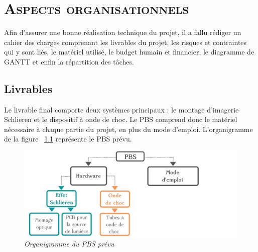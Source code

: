 \renewcommand{\chaptername}{\scshape Partie}
\chapter{\normalfont \scshape Aspects organisationnels}
Afin d'assurer une bonne réalisation technique du projet, il a fallu rédiger un cahier des charges comprenant les livrables du projet, les risques et contraintes qui y sont liés, le matériel utilisé, le budget humain et financier, le diagramme de GANTT et enfin la répartition des tâches.
\section{Livrables }
Le livrable final comporte deux systèmes principaux : le montage d'imagerie Schlieren et le dispositif à onde de choc. Le PBS comprend donc le matériel nécessaire à chaque partie du projet, en plus du mode d'emploi. L'organigramme de la figure ~\ref{fig:PBS} représente le PBS prévu.
\begin{figure}[H]
	\begin{center}
	\includegraphics[scale = 0.2]{figures/PBS.jpg}
	\end{center}
	\caption{\small{\textit{Organigramme du PBS prévu}}}
	\label{fig:PBS}
\end{figure}
